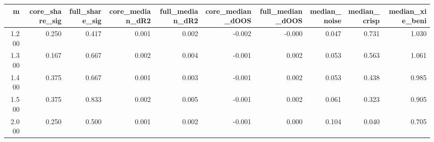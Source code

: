 \begin{tabular}{rrrrrrrrrr}
\toprule
m & core\_share\_sig & full\_share\_sig & core\_median\_dR2 & full\_median\_dR2 & core\_median\_dOOS & full\_median\_dOOS & median\_noise & median\_crisp & median\_xie\_beni \\
\midrule
1.200 & 0.250 & 0.417 & 0.001 & 0.002 & -0.002 & -0.000 & 0.047 & 0.731 & 1.030 \\
1.300 & 0.167 & 0.667 & 0.002 & 0.004 & -0.001 & 0.002 & 0.053 & 0.563 & 1.061 \\
1.400 & 0.375 & 0.667 & 0.001 & 0.003 & -0.001 & 0.002 & 0.053 & 0.438 & 0.985 \\
1.500 & 0.375 & 0.833 & 0.002 & 0.005 & -0.001 & 0.002 & 0.061 & 0.323 & 0.905 \\
2.000 & 0.250 & 0.500 & 0.001 & 0.002 & -0.001 & 0.000 & 0.104 & 0.040 & 0.705 \\
\bottomrule
\end{tabular}
